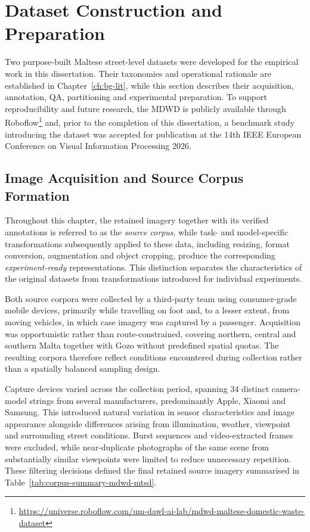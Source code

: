 \newpage
\section{Dataset Construction and Preparation}
\label{sec:md-dataset-construction}
Two purpose-built Maltese street-level datasets were developed for the empirical work in this dissertation. Their taxonomies and operational rationale are established in Chapter~\ref{ch:bg-lit}, while this section describes their acquisition, annotation, \gls{QA}, partitioning and experimental preparation. To support reproducibility and future research, the \gls{MDWD} is publicly available through Roboflow\footnote{\url{https://universe.roboflow.com/um-dawl-ai-lab/mdwd-maltese-domestic-waste-dataset}} and, prior to the completion of this dissertation, a benchmark study introducing the dataset was accepted for publication at the 14th \gls{IEEE} European Conference on Visual Information Processing 2026.

\subsection{Image Acquisition and Source Corpus Formation}
\label{sec:md-acquisition}
Throughout this chapter, the retained imagery together with its verified annotations is referred to as the \emph{source corpus}, while task- and model-specific transformations subsequently applied to these data, including resizing, format conversion, augmentation and object cropping, produce the corresponding \emph{experiment-ready} representations. This distinction separates the characteristics of the original datasets from transformations introduced for individual experiments.

Both source corpora were collected by a third-party team using consumer-grade mobile devices, primarily while travelling on foot and, to a lesser extent, from moving vehicles, in which case imagery was captured by a passenger. Acquisition was opportunistic rather than route-constrained, covering northern, central and southern Malta together with Gozo without predefined spatial quotas. The resulting corpora therefore reflect conditions encountered during collection rather than a spatially balanced sampling design.

Capture devices varied across the collection period, spanning 34 distinct camera-model strings from several manufacturers, predominantly Apple, Xiaomi and Samsung. This introduced natural variation in sensor characteristics and image appearance alongside differences arising from illumination, weather, viewpoint and surrounding street conditions. Burst sequences and video-extracted frames were excluded, while near-duplicate photographs of the same scene from substantially similar viewpoints were limited to reduce unnecessary repetition. These filtering decisions defined the final retained source imagery summarised in Table~\ref{tab:corpus-summary-mdwd-mtsd}.

